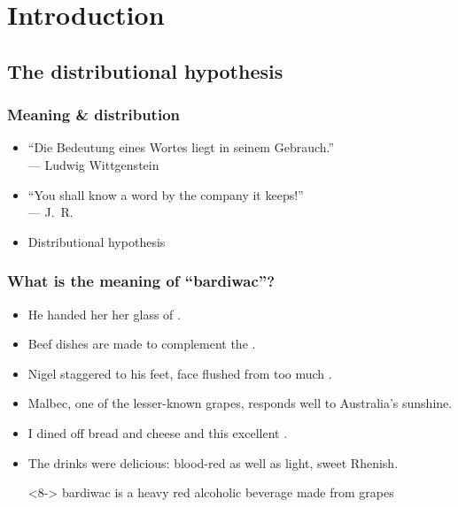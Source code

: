 \section{Introduction}

\subsection{The distributional hypothesis}

\begin{frame}[c]
  \frametitle{Meaning \& distribution}

  \begin{itemize}
  \item ``Die Bedeutung eines Wortes liegt in seinem Gebrauch.''\\
    \hfill --- Ludwig Wittgenstein
  \item[]\pause
  \item ``You shall know a word by the company it keeps!''\\
    \hfill --- J.~R.\ \citet{Firth:57}
  \item[]\pause
  \item Distributional hypothesis \citep[Zellig][]{Harris:54}
  \end{itemize}
\end{frame}

\begin{frame}
  \frametitle{What is the meaning of ``\textbf{bardiwac}''?}

  \begin{itemize}
  \item<2-> He handed her her glass of .
  \item<3-> Beef dishes are made to complement the .
  \item<4-> Nigel staggered to his feet, face flushed from too much .
  \item<5-> Malbec, one of the lesser-known  grapes, responds well to Australia's sunshine.
  \item<6-> I dined off bread and cheese and this excellent .
  \item<7-> The drinks were delicious: blood-red  as well as light, sweet Rhenish.
  \item[\hand]<8-> bardiwac is a heavy red alcoholic beverage made from grapes
  \end{itemize}
\end{frame}

